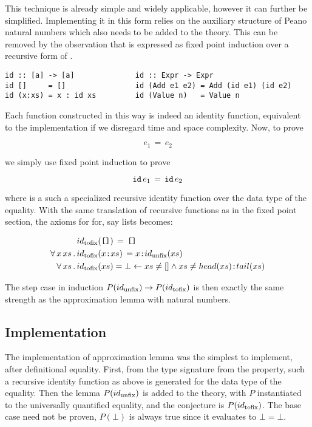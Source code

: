 This technique is already simple and widely applicable, however it can
further be simplified. Implementing it in this form relies on the
auxiliary structure of Peano natural numbers which also needs to be
added to the theory. This can be removed by the observation that is
expressed as fixed point induction over a recursive form of .

\begin{verbatim}
id :: [a] -> [a]              id :: Expr -> Expr
id []     = []                id (Add e1 e2) = Add (id e1) (id e2)
id (x:xs) = x : id xs         id (Value n)   = Value n
\end{verbatim}

Each  function constructed in this way is indeed an identity
function, equivalent to the implementation  if we
disregard time and space complexity. Now, to prove

\begin{equation*}
e_1 \, = \, e_2
\end{equation*}

we simply use fixed point induction to prove

\begin{equation*}
\hs{id} \, e_1 \, = \, \hs{id} \, e_2
\end{equation*}

where  is a such a specialized recursive identity function over
the data type of the equality. With the same translation of recursive
functions as in the fixed point section, the axioms for  for, say
lists becomes:

\begin{align*}
            & \tofix{id}(\hs{[]}) \,   = \, \hs{[]}                                                           \\
\faa{x}{xs} & \tofix{id}(x\hs{:}xs) \, = x\hs{:}\unfix{id}(xs)                                                \\
\fa{xs}     & \tofix{id}(xs)           = \bot  \leftarrow    xs \neq [] \wedge xs \neq head(xs)\hs{:}tail(xs) \\
\end{align*}

The step case in induction $P(id_{\mathrm{unfix}}) \rightarrow P(id_{\mathrm{tofix}})$
is then exactly the same strength as the approximation lemma with
natural numbers.

\subsection{Implementation} The implementation of approximation lemma
was the simplest to implement, after definitional equality. First,
from the type signature from the property, such a recursive identity
function as above is generated for the data type of the equality. Then
the lemma $P(id_{\mathrm{unfix}})$ is added to the theory, with $P$
instantiated to the universally quantified equality, and the
conjecture is $P(id_{\mathrm{tofix}})$. The base case need not be proven,
$P(\bot)$ is always true since it evaluates to $\bot=\bot$.

